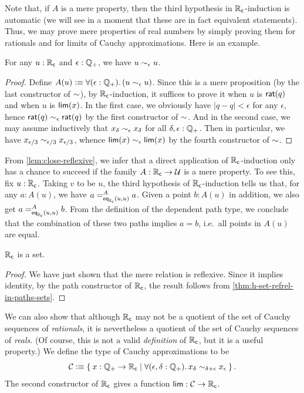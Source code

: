 Note that, if $A$ is a mere property, then the third hypothesis in $\RC$-induction is automatic (we will see in a moment that these are in fact equivalent statements).
Thus, we may prove mere properties of real numbers by simply proving them for rationals and for limits of Cauchy approximations.
Here is an example.

\begin{lem} \label{lem:close-reflexive}
  For any $u:\RC$ and $\epsilon:\Qp$, we have $u\close\epsilon u$.
\end{lem}
\begin{proof}
  Define $A(u) \defeq \fall{\epsilon:\Qp} (u\close\epsilon u)$.
  Since this is a mere proposition (by the last constructor of $\closesym$), by $\RC$-induction, it suffices to prove it when $u$ is $\rcrat(q)$ and when $u$ is $\rclim(x)$.
  In the first case, we obviously have $|q-q|<\epsilon$ for any $\epsilon$, hence $\rcrat(q) \close\epsilon \rcrat(q)$ by the first constructor of $\closesym$.
  And in the second case, we may assume inductively that $x_\delta \close\epsilon x_\delta$ for all $\delta,\epsilon:\Qp$.
  Then in particular, we have $x_{\epsilon/3} \close{\epsilon/3} x_{\epsilon/3}$, whence $\rclim(x) \close{\epsilon} \rclim(x)$ by the fourth constructor of $\closesym$.
\end{proof}

From \cref{lem:close-reflexive}, we infer that a direct application of $\RC$-induction only has a chance to succeed if the family $A:\RC\to\type$ is a mere property.
To see this, fix $u:\RC$.
Taking $v$ to be $u$, the third hypothesis of $\RC$-induction tells us that, for any $a : A(u)$, we have $\dpath{A}{\rceq(u,u)}{a}{a}$.
Given a point $b : A(u)$ in addition, we also get $\dpath{A}{\rceq(u,u)}{a}{b}$.
From the definition of the dependent path type, we conclude that the combination of these two paths implies $a = b$, i.e.\ all points in $A(u)$ are equal.

\begin{thm}\label{thm:Cauchy-reals-are-a-set}
  $\RC$ is a set.
\end{thm}
\begin{proof}
  We have just shown that the mere relation
  is reflexive.
  Since it implies identity, by the path constructor of $\RC$, the result follows from \cref{thm:h-set-refrel-in-paths-sets}.
\end{proof}

We can also show that although $\RC$ may not be a quotient of the set of Cauchy sequences of \emph{rationals}, it is nevertheless a quotient of the set of Cauchy sequences of \emph{reals}.
(Of course, this is not a valid \emph{definition} of $\RC$, but it is a useful property.)
We define the type of Cauchy approximations to be
%
%
%
\begin{equation*}
  \CAP \defeq
  \setof{ x : \Qp \to \RC |
    \fall{\epsilon, \delta : \Qp} x_\delta \close{\delta + \epsilon} x_\epsilon
  }.
\end{equation*}
The second constructor of $\RC$ gives a function $\rclim:\CAP\to\RC$.

